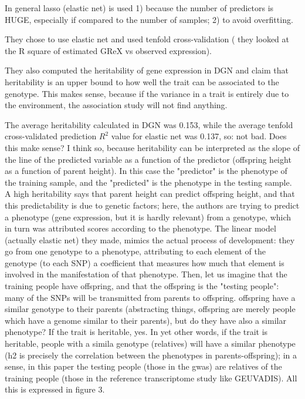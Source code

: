 \documentclass[../main.tex]{subfiles}
\begin{document}
In general lasso (elastic net) is used 1) because the number of 
predictors is HUGE, especially if compared to the number of samples; 2) 
to avoid overfitting.

They chose to use elastic net and used tenfold cross-validation (\ie 
they looked at the R square of estimated GReX vs observed expression).

They also computed the heritability of gene expression in DGN and claim 
that heritability  is an upper 
bound to how well the trait can be associated to the genotype. This 
makes sense, because if the variance in a trait is entirely due to the 
environment, the association study will not find anything.

The average heritability calculated in DGN was 0.153, while the average 
tenfold cross-validated prediction $R^2$ value for elastic net was 
0.137, so: not bad. Does this make sense? I think so, because 
  heritability can be interpreted as the slope of the line of the 
predicted variable as a function of the predictor (\eg offspring height 
as a function of parent height). In this case the "predictor" is the 
phenotype of the training sample, and the "predicted" is the phenotype 
in the testing sample. A high heritability says that parent height can 
predict offspring height, and that this predictability is due to genetic 
factors; here, the authors are trying to predict a phenotype (gene 
expression, but it is hardly relevant) from a genotype, which in turn 
was attributed scores according to the phenotype. The linear model 
(actually elastic net) they made, mimics the actual process of 
development: they go from one genotype to a phenotype, attributing to 
each element of the genotype (\ie to each SNP) a coefficient that 
measures how much that element is involved in the manifestation of that 
phenotype. Then, let us imagine that the training people have offspring, 
and that the offspring is the "testing people": many of the SNPs will be 
transmitted from parents to offspring. offspring have a similar genotype 
to their parents (abstracting things, offspring are merely people which 
have a genome similar to their parents), but do they have also a similar 
phenotype? If the trait is heritable, yes. In yet other words, if the 
trait is heritable, people with a simila genotype (\ie relatives) will 
have a similar phenotype (h2 is precisely the correlation between the 
phenotypes in parents-offspring); in a sense, in this paper the testing 
people (those in the gwas) are relatives of the training people (those 
in the reference transcriptome study like GEUVADIS). All this is 
expressed in figure 3.
\end{document}
